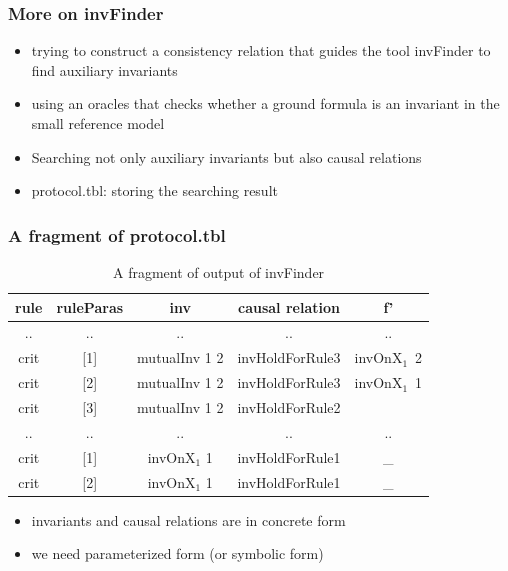 \documentclass{beamer}
\begin{document}
\begin{frame}\frametitle{More on {\sf invFinder}}


\begin{itemize}
\item trying to construct a consistency relation that
guides the tool {\sf invFinder} to find auxiliary invariants

\item using an oracles that checks whether a ground
formula is an invariant in the small reference model


\item Searching not only auxiliary invariants but also causal relations

\item   protocol.tbl:  storing the searching result
\end{itemize}
 \end{frame}

\begin{frame}\frametitle{A fragment of protocol.tbl}
 \begin{table}[!t]
\centering \caption{A fragment of output of {\sf invFinder}}\label{label-ground-causal relation} %
\begin{tabular}{|c|c|c|c|c|  }
\hline
  rule& ruleParas&inv&causal relation &   f'  \\
\hline
  .. & ..&.. &..&.. \\

\hline
  crit  & [1]&mutualInv 1 2& invHoldForRule3 &invOnX$_1$~2 \\
\hline
  crit &[2]& mutualInv 1 2& invHoldForRule3 &invOnX$_1$~1  \\
\hline
  crit & [3]& mutualInv 1 2 & invHoldForRule2  & \\
\hline
  .. & ..&.. &..&.. \\

\hline
  crit  & [1]&invOnX$_1$ 1 & invHoldForRule1 &\_ \\
\hline
  crit &[2]& invOnX$_1$ 1 & invHoldForRule1 &\_  \\
\hline
\end{tabular}
\end{table}
\begin{itemize}
\item invariants and causal relations are in concrete form
\item we need parameterized form (or symbolic form)



\end{itemize}
\end{frame}
\end{document}
